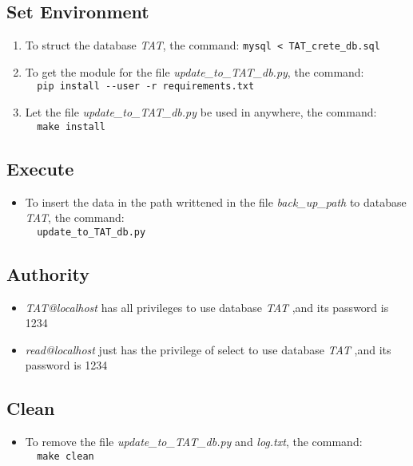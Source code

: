 \documentclass[12pt]{article}    %
\begin{document}
	\subsection{Set Environment}
	\begin{enumerate}
		\item To struct the database {\it TAT}, the command:   \verb|mysql < TAT_crete_db.sql|	
		\item To get the module for the file {\it update\_to\_TAT\_db.py}, the command:\\
		\verb|	pip install --user -r requirements.txt|
		\item Let the file {\it update\_to\_TAT\_db.py} be used in anywhere, the command:\\
		\verb|	make install|
	\end{enumerate}
	\subsection{Execute}
	\begin{itemize}
		\item To insert the data in the path writtened in the file {\it back\_up\_path} to database {\it TAT}, the command:\\
		\verb|	update_to_TAT_db.py|
	\end{itemize}
	\subsection{Authority}
	\begin{itemize}
		\item {\it TAT@localhost} has all privileges to use database {\it TAT} ,and its password is 1234
		\item {\it read@localhost} just has the privilege of select to use database {\it TAT} ,and its password is 1234
	\end{itemize}
	\subsection{Clean}
	\begin{itemize}
		\item To remove the file {\it update\_to\_TAT\_db.py} and {\it log.txt}, the command:\\
		\verb|	make clean|
	\end{itemize}
\end{document}
